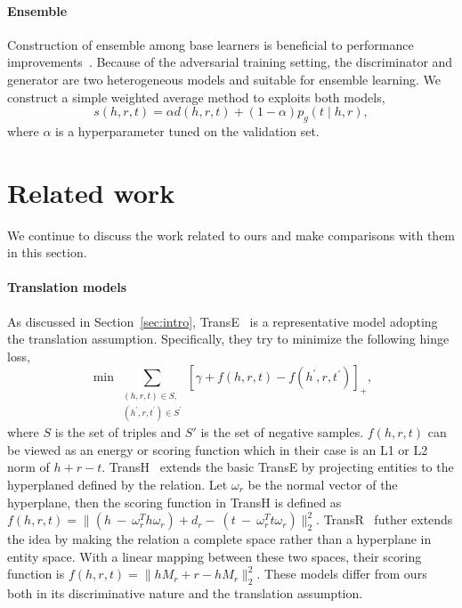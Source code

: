 \documentclass[twocolumn,a4paper,10pt,preprint,3p]{elsarticle}
\begin{document}
\paragraph{Ensemble} Construction of ensemble among base learners is beneficial to performance improvements~\cite{dietterich2000ensemble}. Because of the adversarial training setting, the discriminator and generator are two heterogeneous models and suitable for ensemble learning. We construct a simple weighted average method to exploits both models,
\begin{equation}
    s(h, r, t) = \alpha d(h, r, t) + (1 - \alpha) p_g(t \mid h, r), \label{eq:weighted-ensemble}
\end{equation}
where $\alpha$ is a hyperparameter tuned on the validation set.


\section{Related work}

We continue to discuss the work related to ours and make comparisons with them in this section.

\paragraph{Translation models} As discussed in Section~\ref{sec:intro}, TransE~\cite{TransE2013} is a representative model adopting the translation assumption. Specifically, they try to minimize the following hinge loss,
\begin{equation}
    \min\sum_{\substack{(h, r, t)\in S,\\ (h^\prime, r, t^\prime)\in S^\prime }}
        {\left[\gamma + f(h, r, t) - f(h^\prime, r, t^\prime)\right]}_+, \label{eq:TransE}
\end{equation}
where $S$ is the set of triples and $S'$ is the set of negative samples. $f(h, r, t)$ can be viewed as an energy or scoring function which in their case is an L1 or L2 norm of $h + r - t$. TransH~\cite{TransH2014} extends the basic TransE by projecting entities to the hyperplaned defined by the relation. Let $\omega_r$ be the normal vector of the hyperplane, then the scoring function in TransH is defined as $f(h, r, t) = \lVert(h~-~\omega_r^T h \omega_r) + d_r -~(t~-~\omega_r^T t \omega_r)\rVert_2^2 $.
TransR~\cite{TransR2015} futher extends the idea by making the relation a complete space rather than a hyperplane in entity space. With a linear mapping between these two spaces, their scoring function is $f(h, r, t) = \lVert hM_r + r - h M_r \rVert_2^2$. These models differ from ours both in its discriminative nature and the translation assumption.
\end{document}
